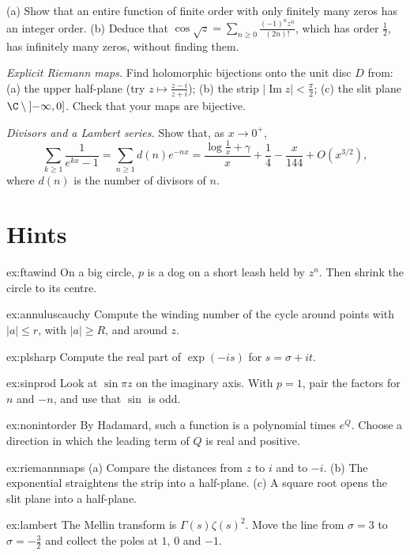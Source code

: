 \begin{exercise}[$\star\star$]\label{ex:nonintorder}
(a) Show that an entire function of finite order with only finitely many zeros has an integer order. (b) Deduce that $\cos\sqrt z=\sum_{n\ge0}\frac{(-1)^nz^n}{(2n)!}$, which has order $\frac12$, has infinitely
many zeros, without finding them.
\end{exercise}

\begin{exercise}[$\star$]\label{ex:riemannmaps}
\emph{Explicit Riemann maps.} Find holomorphic bijections onto the unit disc $D$ from: (a) the upper half-plane (try $z\mapsto\frac{z-i}{z+i}$); (b) the strip $|\operatorname{Im}z|<\frac\pi2$; (c) the slit plane
$\C\setminus\left]-\infty,0\right]$. Check that your maps are bijective.
\end{exercise}

\begin{exercise}[$\star\star$]\label{ex:lambert}
\emph{Divisors and a Lambert series.} Show that, as $x\to0^+$,
\[
\sum_{k\ge1}\frac1{e^{kx}-1}=\sum_{n\ge1}d(n)e^{-nx}=\frac{\log\frac1x+\gamma}x+\frac14-\frac x{144}+O(x^{3/2}),
\]
where $d(n)$ is the number of divisors of $n$.
\end{exercise}

\section{Hints}

\begin{hint}{ex:ftawind}
On a big circle, $p$ is a dog on a short leash held by $z^n$. Then shrink the circle to its centre.
\end{hint}
\begin{hint}{ex:annuluscauchy}
Compute the winding number of the cycle around points with $|a|\le r$, with $|a|\ge R$, and around $z$.
\end{hint}
\begin{hint}{ex:plsharp}
Compute the real part of $\exp(-is)$ for $s=\sigma+it$.
\end{hint}
\begin{hint}{ex:sinprod}
Look at $\sin\pi z$ on the imaginary axis. With $p=1$, pair the factors for $n$ and $-n$, and use that $\sin$ is odd.
\end{hint}
\begin{hint}{ex:nonintorder}
By Hadamard, such a function is a polynomial times $e^{Q}$. Choose a direction in which the leading term of $Q$ is real and positive.
\end{hint}
\begin{hint}{ex:riemannmaps}
(a) Compare the distances from $z$ to $i$ and to $-i$. (b) The exponential straightens the strip into a half-plane. (c) A square root opens the slit plane into a half-plane.
\end{hint}
\begin{hint}{ex:lambert}
The Mellin transform is $\Gamma(s)\zeta(s)^2$. Move the line from $\sigma=3$ to $\sigma=-\frac32$ and collect the poles at $1$, $0$ and $-1$.
\end{hint}

